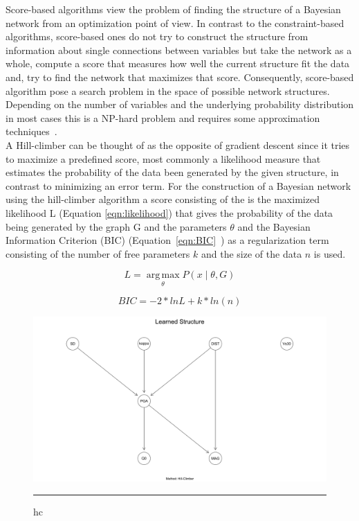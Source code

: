 Score-based algorithms view the problem of finding the structure of a Bayesian network from an optimization point of view. In contrast to the constraint-based algorithms, score-based ones do not try to construct the structure from information about single connections between variables but take the network as a whole, compute a score that measures how well the current structure fit the data and, try to find the network that maximizes that score. Consequently, score-based algorithm pose a search problem in the space of possible network structures. Depending on the number of variables and the underlying probability distribution in most cases this is a NP-hard problem and requires some approximation techniques~\citep{koller2009}. \\
A Hill-climber can be thought of as the opposite of gradient descent since it tries to maximize a predefined score, most commonly a likelihood measure that estimates the probability of the data been generated by the given structure, in contrast to minimizing an error term. For the construction of a Bayesian network using the hill-climber algorithm a score consisting of the is the maximized likelihood L (Equation \ref{eqn:likelihood}) that gives the probability of the data being generated by the graph G and the parameters $\theta$ and the Bayesian Information Criterion (BIC) (Equation~\ref{eqn:BIC}~\citep{schwarz}) as a regularization term consisting of the number of free parameters $k$ and the size of the data $n$ is used.

\begin{equation}
L = \operatorname*{arg\,max}_\theta P(x\mid \theta, G)
\label{eqn:likelihood}
\end{equation}

\begin{equation}
BIC = -2*ln L + k* ln(n)
\label{eqn:BIC}
\end{equation}


\begin{figure}[htbp]%
	\centering
		\includegraphics[scale=0.33]{Figures/hc_one.pdf}
		\rule{35em}{0.5pt}
	\caption[Score-based Hill-Climber Network]{hc}
	\label{fig:hc}
\end{figure}

